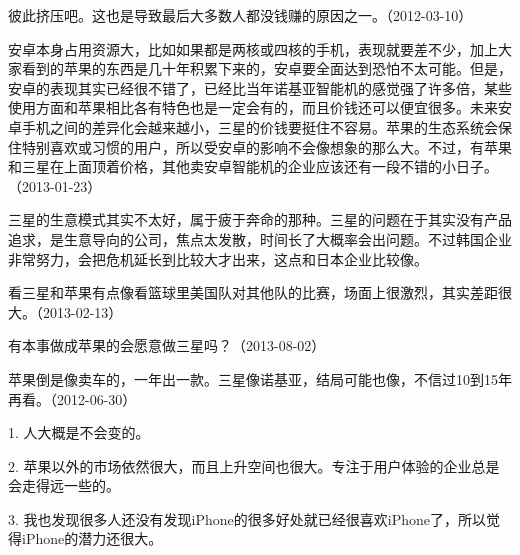 
彼此挤压吧。这也是导致最后大多数人都没钱赚的原因之一。（2012-03-10）


安卓本身占用资源大，比如如果都是两核或四核的手机，表现就要差不少，加上大家看到的苹果的东西是几十年积累下来的，安卓要全面达到恐怕不太可能。但是，安卓的表现其实已经很不错了，已经比当年诺基亚智能机的感觉强了许多倍，某些使用方面和苹果相比各有特色也是一定会有的，而且价钱还可以便宜很多。未来安卓手机之间的差异化会越来越小，三星的价钱要挺住不容易。苹果的生态系统会保住特别喜欢或习惯的用户，所以受安卓的影响不会像想象的那么大。不过，有苹果和三星在上面顶着价格，其他卖安卓智能机的企业应该还有一段不错的小日子。（2013-01-23）


三星的生意模式其实不太好，属于疲于奔命的那种。三星的问题在于其实没有产品追求，是生意导向的公司，焦点太发散，时间长了大概率会出问题。不过韩国企业非常努力，会把危机延长到比较大才出来，这点和日本企业比较像。

看三星和苹果有点像看篮球里美国队对其他队的比赛，场面上很激烈，其实差距很大。（2013-02-13）


有本事做成苹果的会愿意做三星吗？（2013-08-02）

苹果倒是像卖车的，一年出一款。三星像诺基亚，结局可能也像，不信过10到15年再看。（2012-06-30）


1. 人大概是不会变的。

2. 苹果以外的市场依然很大，而且上升空间也很大。专注于用户体验的企业总是会走得远一些的。

3. 我也发现很多人还没有发现iPhone的很多好处就已经很喜欢iPhone了，所以觉得iPhone的潜力还很大。


